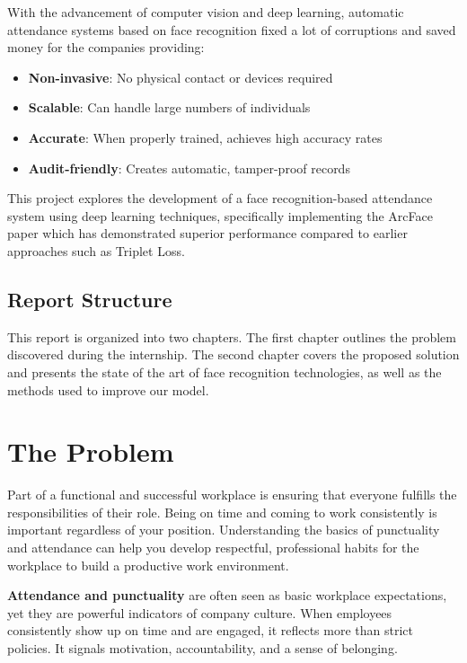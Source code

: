 \documentclass[sommairechap,stylejchiquet]{these_gi}
\begin{document}
With the advancement of computer vision and deep learning, automatic attendance systems based on face recognition fixed a lot of corruptions and saved money for the companies providing:

\begin{itemize}
    \item \textbf{Non-invasive}: No physical contact or devices required
    \item \textbf{Scalable}: Can handle large numbers of individuals
    \item \textbf{Accurate}: When properly trained, achieves high accuracy rates
    \item \textbf{Audit-friendly}: Creates automatic, tamper-proof records
\end{itemize}

This project explores the development of a face recognition-based attendance system using deep learning techniques, specifically implementing the ArcFace paper which has demonstrated superior performance compared to earlier approaches such as Triplet Loss.

\section{Report Structure}
This report is organized into two chapters. The first chapter outlines the problem discovered during the internship. The second chapter covers the proposed solution and presents the state of the art of face recognition technologies, as well as the methods used to improve our model.

\chapter{The Problem}

Part of a functional and successful workplace is ensuring that everyone fulfills the responsibilities of their role. Being on time and coming to work consistently is important regardless of your position. Understanding the basics of punctuality and attendance can help you develop respectful, professional habits for the workplace to build a productive work environment.

\textbf{Attendance and punctuality} are often seen as basic workplace expectations, yet they are powerful indicators of company culture. When employees consistently show up on time and are engaged, it reflects more than strict policies. It signals motivation, accountability, and a sense of belonging.
\end{document}
